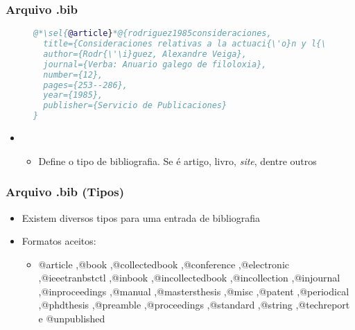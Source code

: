 \begin{frame}[fragile] \frametitle{Arquivo .bib}
\begin{figure}[!t]
\begin{lstlisting}[language=BibTeX]
@*\sel{@article}*@{rodriguez1985consideraciones,
  title={Consideraciones relativas a la actuaci{\'o}n y l{\'\i}mites de las oposiciones fonol{\'o}gicas interrupto/continuo y tenso/flojo en espa{\~n}ol},
  author={Rodr{\'\i}guez, Alexandre Veiga},
  journal={Verba: Anuario galego de filoloxia},
  number={12},
  pages={253--286},
  year={1985},
  publisher={Servicio de Publicaciones}
}
\end{lstlisting}
\end{figure}

\begin{itemize}
	\item {}
	\begin{itemize}
		\item Define o tipo de bibliografia. Se é artigo, livro, \textit{site}, dentre outros
	\end{itemize}
\end{itemize}
\end{frame}

\begin{frame}[fragile] \frametitle{Arquivo .bib (Tipos)}
\begin{itemize}
	\item Existem diversos tipos para uma entrada de bibliografia
	\item Formatos aceitos: 
	\begin{itemize}
		\item @article ,@book ,@collectedbook ,@conference ,@electronic ,@ieeetranbstctl ,@inbook ,@incollectedbook ,@incollection ,@injournal ,@inproceedings ,@manual ,@mastersthesis ,@misc ,@patent ,@periodical ,@phdthesis ,@preamble ,@proceedings ,@standard ,@string ,@techreport e @unpublished
	\end{itemize}
\end{itemize}
\end{frame}

